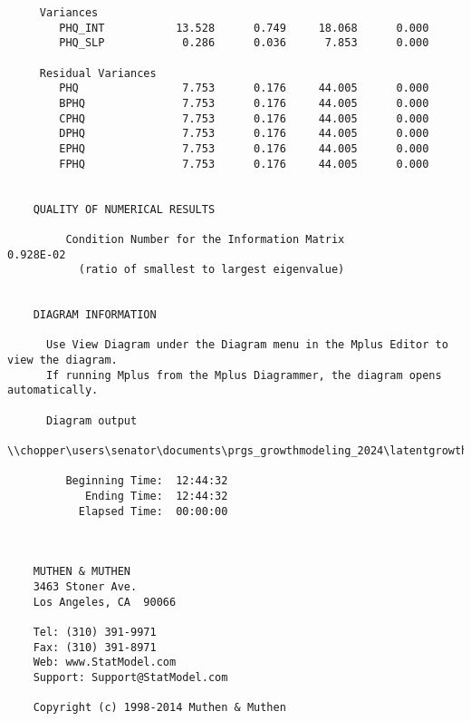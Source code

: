 \documentclass[11pt]{article}
\begin{document}
\begin{verbatim}
     Variances
        PHQ_INT           13.528      0.749     18.068      0.000
        PHQ_SLP            0.286      0.036      7.853      0.000
    
     Residual Variances
        PHQ                7.753      0.176     44.005      0.000
        BPHQ               7.753      0.176     44.005      0.000
        CPHQ               7.753      0.176     44.005      0.000
        DPHQ               7.753      0.176     44.005      0.000
        EPHQ               7.753      0.176     44.005      0.000
        FPHQ               7.753      0.176     44.005      0.000
    
    
    QUALITY OF NUMERICAL RESULTS
    
         Condition Number for the Information Matrix              0.928E-02
           (ratio of smallest to largest eigenvalue)
    
    
    DIAGRAM INFORMATION
    
      Use View Diagram under the Diagram menu in the Mplus Editor to view the diagram.
      If running Mplus from the Mplus Diagrammer, the diagram opens automatically.
    
      Diagram output
        \\chopper\users\senator\documents\prgs_growthmodeling_2024\latentgrowth\latentgrowth.dgm
    
         Beginning Time:  12:44:32
            Ending Time:  12:44:32
           Elapsed Time:  00:00:00
    
    
    
    MUTHEN & MUTHEN
    3463 Stoner Ave.
    Los Angeles, CA  90066
    
    Tel: (310) 391-9971
    Fax: (310) 391-8971
    Web: www.StatModel.com
    Support: Support@StatModel.com
    
    Copyright (c) 1998-2014 Muthen & Muthen
    
\end{verbatim}
\end{document}
